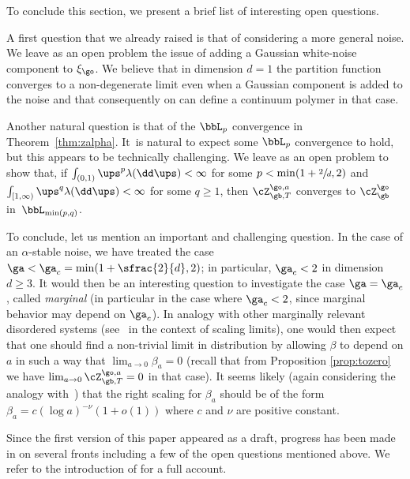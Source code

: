 To conclude this section, we present a brief list of interesting open questions.
\begin{enumeratea}
\item
A first question that we already raised is that of
considering a more general noise.
We leave as an open problem the
issue of adding a Gaussian white-noise component to $\xi_{\go}$. We believe that
in dimension $d=1$
the partition function converges to a non-degenerate limit even when a Gaussian component is added to the noise and that consequently on can define a continuum polymer in that case.

\item
Another natural question is that of the $\bbL_p$ convergence in Theorem~\ref{thm:zalpha}.
It~is natural to expect some $\bbL_p$ convergence to hold,
but this appears to be technically challenging.
We leave as an open problem to show that,
if $\int_{(0,1)} \ups^{p} \lambda(\dd \ups) < \infty$
for some $p < \min(1+\sfrac2d,2)$ and
$\int_{[1,\infty)} \ups^{q} \lambda(\dd \ups) < \infty$
for some $q \geq 1$,
then $\cZ_{\gb,T}^{\go,a}$ converges to $\cZ_{\gb}^{\go}$
in~$\bbL_{\min(p,q)}$.

\item
To conclude, let us mention an important and challenging question.
In the case of an $\alpha$-stable noise,
we have treated the case $\ga < \ga_c = \min(1+\sfrac{2}{d},2)$; in particular, $\ga_c <2$ in dimension $d\geq 3$.
It would then be an interesting question to investigate the
case $\ga = \ga_c$, called \emph{marginal} (in particular in the case where $\ga_c <2$, since marginal behavior may depend on $\ga_c$).
In analogy with other marginally relevant
disordered systems (see~\cite{CSZ15} in the context of scaling limits),
one
would then expect that one should find a non-trivial limit in distribution by allowing $\beta$ to depend on $a$ in such a way that $\lim_{a\to 0}\beta_a=0$ (recall that from Proposition \ref{prop:tozero} we have $\lim_{a\to 0}\cZ_{\gb,T}^{\go,a}=0$ in that case). It seems likely (again considering the analogy with~\cite{CSZ15}) that the right scaling for $\beta_a$ should be of the form $\beta_a= c(\log a)^{-\nu}(1+o(1))$ where $c$ and $\nu$ are positive constant.
\end{enumeratea}

\begin{rem}
Since the first version of this paper appeared as a draft, progress has been made in \cite{BCL21} on several fronts including a few of the open questions mentioned above. We refer to the introduction of \cite{BCL21} for a full account.\enlargethispage{.9\baselineskip}%
\end{rem}

